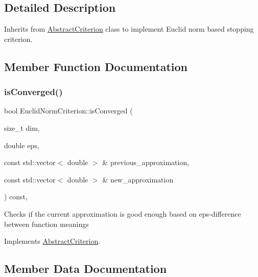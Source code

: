 \subsection{Detailed Description}
Inherits from \hyperlink{class_abstract_criterion}{Abstract\+Criterion} class to implement Euclid norm based stopping criterion. 

\subsection{Member Function Documentation}
\mbox{\label{class_euclid_norm_criterion_a210c1396bb5ba2fab199f64eea3a8f76}} 
\subsubsection{\texorpdfstring{is\+Converged()}{isConverged()}}
{\footnotesize\ttfamily bool Euclid\+Norm\+Criterion\+::is\+Converged (\begin{DoxyParamCaption}\item[{size\+\_\+t}]{dim,  }\item[{double}]{eps,  }\item[{const std\+::vector$<$ double $>$ \&}]{previous\+\_\+approximation,  }\item[{const std\+::vector$<$ double $>$ \&}]{new\+\_\+approximation }\end{DoxyParamCaption}) const\hspace{0.3cm}{\ttfamily [override]}, {\ttfamily [virtual]}}

Checks if the current approximation is good enough based on eps-\/difference between function meanings 

Implements \hyperlink{class_abstract_criterion_aa38fc5fe24aabd2b925509961eb017df}{Abstract\+Criterion}.



\subsection{Member Data Documentation}
\mbox{\label{class_euclid_norm_criterion_afbace03a4e9df12244904b3bdcf7a9e2}} 
